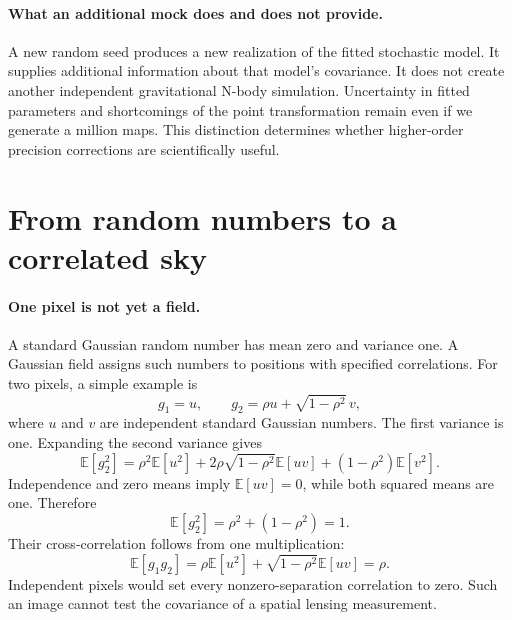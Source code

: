 \documentclass[11pt]{article}
\newcommand{\E}{\mathbb E}
\begin{document}
\paragraph{What an additional mock does and does not provide.}
A new random seed produces a new realization of the fitted stochastic
model. It supplies additional information about that model's covariance.
It does not create another independent gravitational N-body simulation.
Uncertainty in fitted parameters and shortcomings of the point transformation
remain even if we generate a million maps. This distinction determines
whether higher-order precision corrections are scientifically useful.

\section{From random numbers to a correlated sky}
\paragraph{One pixel is not yet a field.}
A standard Gaussian random number has mean zero and variance one. A
Gaussian field assigns such numbers to positions with specified correlations.
For two pixels, a simple example is
\begin{equation}
 g_1=u,\qquad g_2=\rho u+\sqrt{1-\rho^2}\,v,
\end{equation}
where $u$ and $v$ are independent standard Gaussian numbers. The first
variance is one. Expanding the second variance gives
\begin{equation}
 \E[g_2^2]=\rho^2\E[u^2]+2\rho\sqrt{1-\rho^2}\E[uv]
                 +(1-\rho^2)\E[v^2].
\end{equation}
Independence and zero means imply $\E[uv]=0$, while both squared means
are one. Therefore
\begin{equation}
 \E[g_2^2]=\rho^2+(1-\rho^2)=1.
\end{equation}
Their cross-correlation follows from one multiplication:
\begin{equation}
 \E[g_1g_2]=\rho\E[u^2]+\sqrt{1-\rho^2}\E[uv]=\rho.
\end{equation}
Independent pixels would set every nonzero-separation correlation to zero.
Such an image cannot test the covariance of a spatial lensing measurement.
\end{document}

